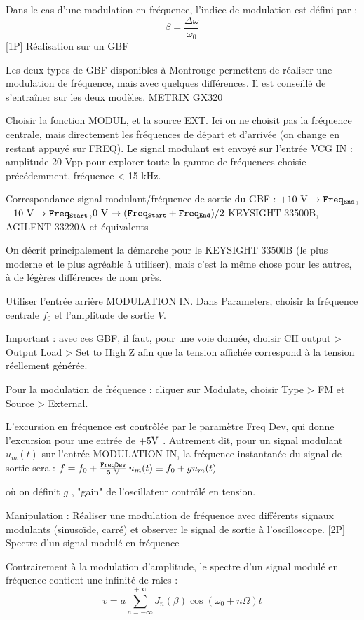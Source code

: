 \documentclass{article}%
\begin{document}
Dans le cas d'une modulation en fréquence, l'indice de modulation est défini par :
\[ \beta = \frac{\Delta \omega}{\omega_0}\]
[1P] Réalisation sur un GBF

Les deux types de GBF disponibles à Montrouge permettent de réaliser une modulation de fréquence, mais avec quelques différences. Il est conseillé de s'entraîner sur les deux modèles.
METRIX GX320

Choisir la fonction MODUL, et la source EXT. Ici on ne choisit pas la fréquence centrale, mais directement les fréquences de départ et d'arrivée (on change en restant appuyé sur FREQ). Le signal modulant est envoyé sur l'entrée VCG IN : amplitude 20 Vpp pour explorer toute la gamme de fréquences choisie précédemment, fréquence < 15 kHz.

Correspondance signal modulant/fréquence de sortie du GBF : $+ 10 \ \rm V \to \mathtt{Freq_{End}}$, $- 10 \ \rm V \to \mathtt{Freq_{Start}}$,$ 0 \ \rm V \to (\mathtt{Freq_{Start} + Freq_{End}})/2$
KEYSIGHT 33500B, AGILENT 33220A et équivalents

On décrit principalement la démarche pour le KEYSIGHT 33500B (le plus moderne et le plus agréable à utiliser), mais c'est la même chose pour les autres, à de légères différences de nom près.

Utiliser l'entrée arrière MODULATION IN. Dans Parameters, choisir la fréquence centrale $f_0$ et l'amplitude de sortie $V $.

Important : avec ces GBF, il faut, pour une voie donnée, choisir CH output > Output Load > Set to High Z afin que la tension affichée correspond à la tension réellement générée.

Pour la modulation de fréquence : cliquer sur Modulate, choisir Type > FM et Source > External.

L'excursion en fréquence est contrôlée par le paramètre Freq Dev, qui donne l'excursion pour une entrée de $ + 5  \rm V$ . Autrement dit, pour un signal modulant $u_m(t)$ sur l'entrée MODULATION IN, la fréquence instantanée du signal de sortie sera :
$f = f_0 + \frac{\mathtt{Freq Dev}}{5 \ \rm V} \, u_m(t) \equiv f_0 + g u_m(t)$

où on définit $g$ , "gain" de l'oscillateur contrôlé en tension.

Manipulation : Réaliser une modulation de fréquence avec différents signaux modulants (sinusoïde, carré) et observer le signal de sortie à l'oscilloscope.
[2P] Spectre d'un signal modulé en fréquence

Contrairement à la modulation d'amplitude, le spectre d'un signal modulé en fréquence contient une infinité de raies :
\[ v = a \sum_{n=-\infty}^{+\infty} J_n(\beta) \cos\left(\omega_0 + n\Omega\right) t\]
\end{document}
